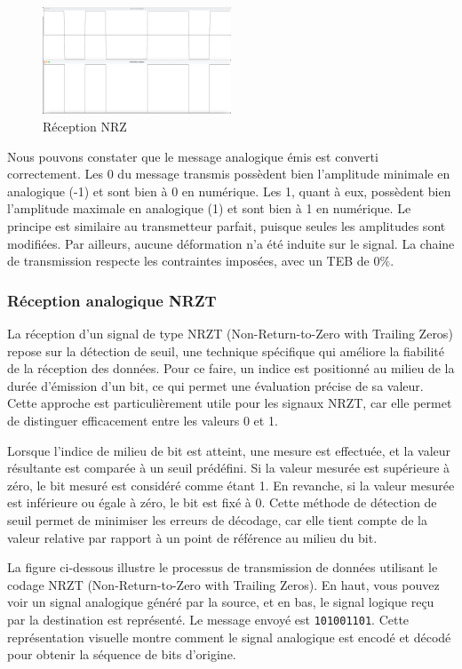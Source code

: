 \begin{figure}[H]
    \centering
    \includegraphics[width=0.5\textwidth]{img/etape2_reception_NRZ.png}
    \caption{Réception NRZ}
    \label{fig:teb1}
\end{figure}

Nous pouvons constater que le message analogique émis est converti correctement. Les 0 du message transmis possèdent bien l'amplitude minimale en analogique (-1) et sont bien à 0 en numérique. Les 1, quant à eux, possèdent bien l'amplitude maximale en analogique (1) et sont bien à 1 en numérique. Le principe est similaire au transmetteur parfait, puisque seules les amplitudes sont modifiées. Par ailleurs, aucune déformation n'a été induite sur le signal. La chaine de transmission respecte les contraintes imposées, avec un TEB de 0\%.

\subsubsection{Réception analogique NRZT}

La réception d'un signal de type NRZT (Non-Return-to-Zero with Trailing Zeros) repose sur la détection de seuil, une technique spécifique qui améliore la fiabilité de la réception des données. Pour ce faire, un indice est positionné au milieu de la durée d'émission d'un bit, ce qui permet une évaluation précise de sa valeur. Cette approche est particulièrement utile pour les signaux NRZT, car elle permet de distinguer efficacement entre les valeurs 0 et 1.

Lorsque l'indice de milieu de bit est atteint, une mesure est effectuée, et la valeur résultante est comparée à un seuil prédéfini. Si la valeur mesurée est supérieure à zéro, le bit mesuré est considéré comme étant 1. En revanche, si la valeur mesurée est inférieure ou égale à zéro, le bit est fixé à 0. Cette méthode de détection de seuil permet de minimiser les erreurs de décodage, car elle tient compte de la valeur relative par rapport à un point de référence au milieu du bit.

La figure ci-dessous illustre le processus de transmission de données utilisant le codage NRZT (Non-Return-to-Zero with Trailing Zeros). En haut, vous pouvez voir un signal analogique généré par la source,  et en bas, le signal logique reçu par la destination est représenté. Le message envoyé est \texttt{101001101}. Cette représentation visuelle montre comment le signal analogique est encodé et décodé pour obtenir la séquence de bits d'origine. 

